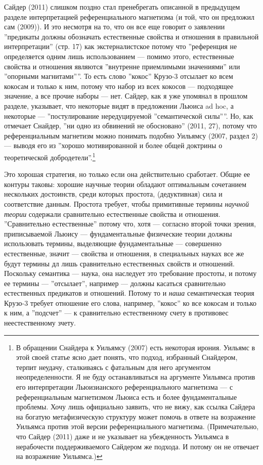 \documentclass[11pt]{book}
\begin{document}
Сайдер (2011) слишком поздно стал пренебрегать описанной в предыдущем разделе интерпретацией референциального магнетизма (и той, что он предложил сам (2009)). И это несмотря на то, что он все еще говорит о заявлении ''предикаты должны обозначать естественные свойства и отношения в правильной интерпретации'' (стр. 17) как экстерналистское потому что ''референция не определяется одним лишь использованием --- помимо этого, естественные свойства и отношения являются ''внутренне приемлимыми значениями'' или ''опорными магнитами''''. То есть слово ''кокос'' Крузо-3 отсылает ко всем кокосам и только к ним, потому что набор из всех кокосов --- подходящее значение, а все прочие наборы --- нет. Сайдер, как я уже упомянал в прошлом разделе, указывает, что некоторые видят в предложении Льюиса ad hoc, а некоторые --- ''постулирование нередуцируемой ''семантической силы''''. Но, как отмечает Снайдер, ''ни одно из обвинений не обосновано'' (2011, 27), потому что референциальным магнетизм можно понимать подобно Уильямсу (2007, раздел 2) --- выводя его из ''хорошо мотивированной и более общей доктрины о теоретической добродетели''.\footnote{В обращении Снайдера к Уильямсу (2007) есть некоторая ирония. Уильямс в этой своей статье ясно дает понять, что подход, избранный Снайдером, терпит неудачу, сталкиваясь с фатальным для него аргументом неопределенности. Я не буду останавливаться на аргументе Уильямса против его интерпретации Льюизианского референциального магнетизма --- с референциальным магнетизмом Льюиса есть и более фундаментальные проблемы. Хочу лишь официально заявить, что не вижу, как ссылка Сайдера на богатую метафизическую структуру может помочь в ответе на возражение Уильямса против этой версии референциального магнетизма. (Примечательно, что Сайдер (2011) даже и не указывает на убежденность Уильямса в нерабочести поддерживаемого Сайдером же подхода. И потому он не отвечает на возражение Уильямса.)}

Это хорошая стратегия, но только если она действительно сработает. Общие ее контуры таковы: хорошие научные теории обладают оптимальным сочетанием нескольких достоинств, среди которых простота, (дедуктивная) сила и соответствие данным. Простота требует, чтобы примитивные термины \textit{научной теории} содержали сравнительно естественные свойства и отношения. ''Сравнительно естественные'' потому что, хотя --- согласно второй точки зрения, приписываемой Льюису --- фундаментальные физические теории должны использовать термины, выделяющие фундаментальные --- совершенно естественные, значит --- свойства и отношения, в специальных науках все же будут термины дл лишь сравнительно естественных свойств и отношений. Поскольку семантика --- наука, она наследует это требование простоты, и потому ее термины --- ''отсылает'', например --- должны касаться сравнительно естественных предикатов и отношений. Потому то и \textit{наша} семантическая теория Крузо-3 требует отношение его слова, например, ''кокос'' ко все кокосам и только к ним, а ''подсчет'' --- к сравнительно естественному счету в противовес неестественному зчету.
\end{document}
